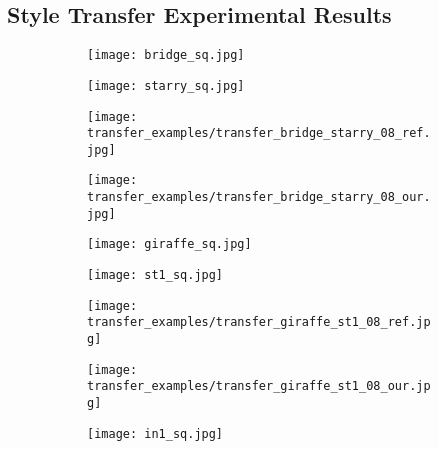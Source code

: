 
  
\subsection{Style Transfer Experimental Results}
\begin{figure}[H]
	\centering
	\begin{subfigure}[b]{0.225\linewidth}
		\texttt{[image: bridge\_sq.jpg]} %
	\end{subfigure}
	\begin{subfigure}[b]{0.225\linewidth}
		\texttt{[image: starry\_sq.jpg]} %
	\end{subfigure}
	\begin{subfigure}[b]{0.225\linewidth}
		\texttt{[image: transfer\_examples/transfer\_bridge\_starry\_08\_ref.jpg]} %
	\end{subfigure}
	\begin{subfigure}[b]{0.225\linewidth}
		\texttt{[image: transfer\_examples/transfer\_bridge\_starry\_08\_our.jpg]} %
	\end{subfigure}
	\centering
	\begin{subfigure}[b]{0.225\linewidth}
		\texttt{[image: giraffe\_sq.jpg]} %
	\end{subfigure}
	\begin{subfigure}[b]{0.225\linewidth}
		\texttt{[image: st1\_sq.jpg]} %
	\end{subfigure}
	\begin{subfigure}[b]{0.225\linewidth}
		\texttt{[image: transfer\_examples/transfer\_giraffe\_st1\_08\_ref.jpg]} %
	\end{subfigure}
	\begin{subfigure}[b]{0.225\linewidth}
		\texttt{[image: transfer\_examples/transfer\_giraffe\_st1\_08\_our.jpg]} %
	\end{subfigure}
	\centering
	\begin{subfigure}[b]{0.225\linewidth}
		\texttt{[image: in1\_sq.jpg]} %

\end{subfigure}
\end{figure}
